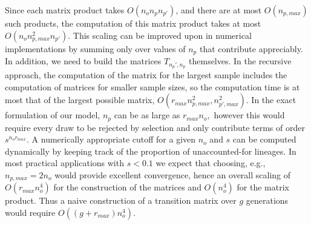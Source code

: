 \documentclass[review,nonatbib]{elsarticle}
\begin{document}
Since each matrix product takes $O(n_o n_p n_{p'})$, and there are at most $O(n_{p,max})$ such
products, the computation of this matrix product takes at most $O(n_o n_{p,max}^2 n_{p'}).$ This
scaling can be improved upon in numerical implementations by summing only over values of $n_p$ that
contribute appreciably.  In addition, we need to build the matrices $T_{n_p', n_p}$ themselves.  In
the recursive approach, the computation of the matrix for the largest sample includes the
computation of matrices for smaller sample sizes, so the computation time is at most that of the
largest possible matrix, $O(r_{max} n_{p,max}^2, n_{p',max}^2).$ In the exact formulation of our
model, $n_p$ can be as large as $ r_{max} n_o,$ however this would require every draw to be rejected
by selection and only contribute terms of order $s^{n_o r_{max}}.$ A numerically appropriate cutoff
for a given $n_o$ and $s$ can be computed dynamically by keeping track of the proportion of
unaccounted-for lineages. In most practical applications with $s<0.1$ we expect that choosing, e.g.,
$n_{p,max}=  2 n_o$ would provide excellent convergence, hence an overall scaling of   $O(r_{max}
n_{o}^4)$ for the construction of the matrices and $O(n_o^4)$ for the matrix product.  Thus a naive
construction of a transition matrix over $g$ generations would require  $O( (g + r_{max} ) n_o^4).$
\end{document}
